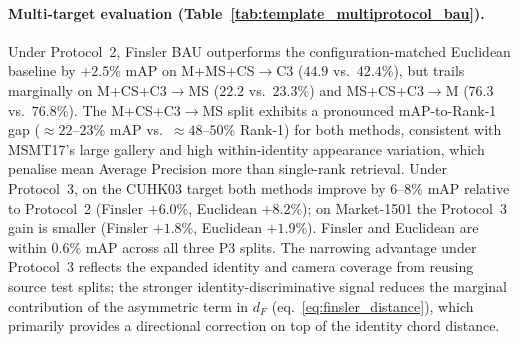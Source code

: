 \paragraph{Multi-target evaluation (Table~\ref{tab:template_multiprotocol_bau}).}
Under Protocol~2, Finsler BAU outperforms the configuration-matched Euclidean baseline by $+2.5\%$ mAP on M+MS+CS$\rightarrow$C3 ($44.9$ vs.\ $42.4\%$), but trails marginally on M+CS+C3$\rightarrow$MS ($22.2$ vs.\ $23.3\%$) and MS+CS+C3$\rightarrow$M ($76.3$ vs.\ $76.8\%$). The M+CS+C3$\rightarrow$MS split exhibits a pronounced mAP-to-Rank-1 gap (${\approx}22$--$23\%$ mAP vs.\ ${\approx}48$--$50\%$ Rank-1) for both methods, consistent with MSMT17's large gallery and high within-identity appearance variation, which penalise mean Average Precision more than single-rank retrieval. Under Protocol~3, on the CUHK03 target both methods improve by $6$--$8\%$ mAP relative to Protocol~2 (Finsler $+6.0\%$, Euclidean $+8.2\%$); on Market-1501 the Protocol~3 gain is smaller (Finsler $+1.8\%$, Euclidean $+1.9\%$). Finsler and Euclidean are within $0.6\%$ mAP across all three P3 splits. The narrowing advantage under Protocol~3 reflects the expanded identity and camera coverage from reusing source test splits; the stronger identity-discriminative signal reduces the marginal contribution of the asymmetric term in $d_F$ (eq.~\ref{eq:finsler_distance}), which primarily provides a directional correction on top of the identity chord distance.


\begin{table}[t]
\centering
\caption{Multi-seed evaluation on M+MS+CS$\rightarrow$C3 (Finsler BAU, Arm~1b, five independent runs). Mean and standard deviation are reported across seeds.}
\label{tab:multiseed}
\end{table}

